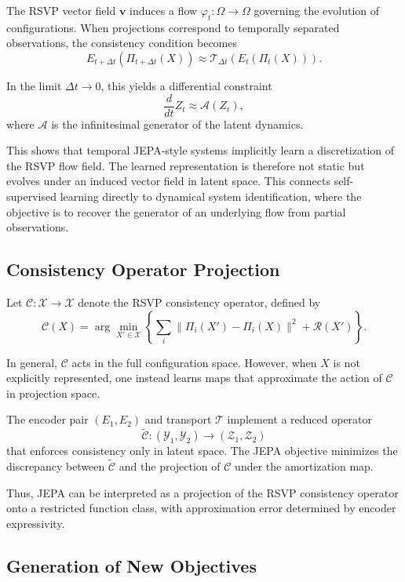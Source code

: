 \documentclass[12pt, oneside]{article}
\begin{document}
The RSVP vector field $\mathbf{v}$ induces a flow $\varphi_t : \Omega \to \Omega$ governing the evolution of configurations. When projections correspond to temporally separated observations, the consistency condition becomes
\[
E_{t+\Delta t}(\Pi_{t+\Delta t}(X)) \approx \mathcal{T}_{\Delta t}(E_t(\Pi_t(X))).
\]

In the limit $\Delta t \to 0$, this yields a differential constraint
\[
\frac{d}{dt} Z_t \approx \mathcal{A}(Z_t),
\]
where $\mathcal{A}$ is the infinitesimal generator of the latent dynamics.

This shows that temporal JEPA-style systems implicitly learn a discretization of the RSVP flow field. The learned representation is therefore not static but evolves under an induced vector field in latent space. This connects self-supervised learning directly to dynamical system identification, where the objective is to recover the generator of an underlying flow from partial observations.

\subsection{Consistency Operator Projection}

Let $\mathcal{C} : \mathcal{X} \to \mathcal{X}$ denote the RSVP consistency operator, defined by
\[
\mathcal{C}(X) = \arg\min_{X' \in \mathcal{X}}
\left\{
\sum_i \|\Pi_i(X') - \Pi_i(X)\|^2 + \mathcal{R}(X')
\right\}.
\]

In general, $\mathcal{C}$ acts in the full configuration space. However, when $X$ is not explicitly represented, one instead learns maps that approximate the action of $\mathcal{C}$ in projection space.

The encoder pair $(E_1, E_2)$ and transport $\mathcal{T}$ implement a reduced operator
\[
\widetilde{\mathcal{C}} : (\mathcal{Y}_1, \mathcal{Y}_2) \to (\mathcal{Z}_1, \mathcal{Z}_2)
\]
that enforces consistency only in latent space. The JEPA objective minimizes the discrepancy between $\widetilde{\mathcal{C}}$ and the projection of $\mathcal{C}$ under the amortization map.

Thus, JEPA can be interpreted as a projection of the RSVP consistency operator onto a restricted function class, with approximation error determined by encoder expressivity.

\subsection{Generation of New Objectives}
\end{document}
